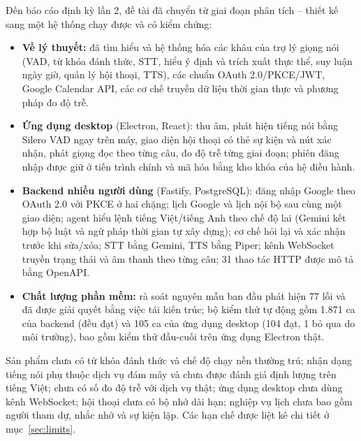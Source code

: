 \newcommand{\mucketluan}[1]{\par\vspace{4pt}{\bfseries #1}\par\nopagebreak}

\mucketluan{1. Kết quả đạt được}
Đến báo cáo định kỳ lần 2, đề tài đã chuyển từ giai đoạn phân tích – thiết kế sang một hệ thống chạy được và có kiểm chứng:
\begin{itemize}
  \item \textbf{Về lý thuyết:} đã tìm hiểu và hệ thống hóa các khâu của trợ lý giọng nói (VAD, từ khóa đánh thức, STT, hiểu ý định và trích xuất thực thể, suy luận ngày giờ, quản lý hội thoại, TTS), các chuẩn OAuth 2.0/PKCE/JWT, Google Calendar API, các cơ chế truyền dữ liệu thời gian thực và phương pháp đo độ trễ.
  \item \textbf{Ứng dụng desktop} (Electron, React): thu âm, phát hiện tiếng nói bằng Silero VAD ngay trên máy, giao diện hội thoại có thẻ sự kiện và nút xác nhận, phát giọng đọc theo từng câu, đo độ trễ từng giai đoạn; phiên đăng nhập được giữ ở tiến trình chính và mã hóa bằng kho khóa của hệ điều hành.
  \item \textbf{Backend nhiều người dùng} (Fastify, PostgreSQL): đăng nhập Google theo OAuth 2.0 với PKCE ở hai chặng; lịch Google và lịch nội bộ sau cùng một giao diện; agent hiểu lệnh tiếng Việt/tiếng Anh theo chế độ lai (Gemini kết hợp bộ luật và ngữ pháp thời gian tự xây dựng); cơ chế hỏi lại và xác nhận trước khi sửa/xóa; STT bằng Gemini, TTS bằng Piper; kênh WebSocket truyền trạng thái và âm thanh theo từng câu; 31 thao tác HTTP được mô tả bằng OpenAPI.
  \item \textbf{Chất lượng phần mềm:} rà soát nguyên mẫu ban đầu phát hiện 77 lỗi và đã được giải quyết bằng việc tái kiến trúc; bộ kiểm thử tự động gồm 1.871 ca của backend (đều đạt) và 105 ca của ứng dụng desktop (104 đạt, 1 bỏ qua do môi trường), bao gồm kiểm thử đầu-cuối trên ứng dụng Electron thật.
\end{itemize}

\mucketluan{2. Hạn chế}
Sản phẩm chưa có từ khóa đánh thức và chế độ chạy nền thường trú; nhận dạng tiếng nói phụ thuộc dịch vụ đám mây và chưa được đánh giá định lượng trên tiếng Việt; chưa có số đo độ trễ với dịch vụ thật; ứng dụng desktop chưa dùng kênh WebSocket; hội thoại chưa có bộ nhớ dài hạn; nghiệp vụ lịch chưa bao gồm người tham dự, nhắc nhở và sự kiện lặp. Các hạn chế được liệt kê chi tiết ở mục~\ref{sec:limits}.

